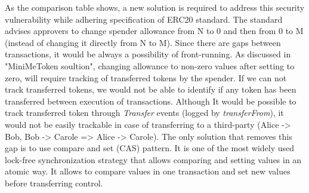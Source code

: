 \noindent As the comparison table shows, a new solution is required to address this security vulnerability while adhering specification of ERC20 standard. The standard advises approvers to change spender allowance from N to 0 and then from 0 to M (instead of changing it directly from N to M). Since there are gaps between transactions, it would be always a possibility of front-running. As discussed in "MiniMeToken soultion", changing allowance to non-zero values after setting to zero, will require tracking of transferred tokens by the spender. If we can not track transferred tokens, we would not be able to identify if any token has been transferred between execution of transactions. Although It would be possible to track transferred token through \textit{Transfer} events (logged by \textit{transferFrom}), it would not be easily trackable in case of transferring to a third-party (Alice -> Bob, Bob -> Carole => Alice -> Carole). The only solution that removes this gap is to use compare and set (CAS) pattern\cite{Ref06}. It is one of the most widely used lock-free synchronization strategy that allows comparing and setting values in an atomic way. It allows to compare values in one transaction and set new values before transferring control.